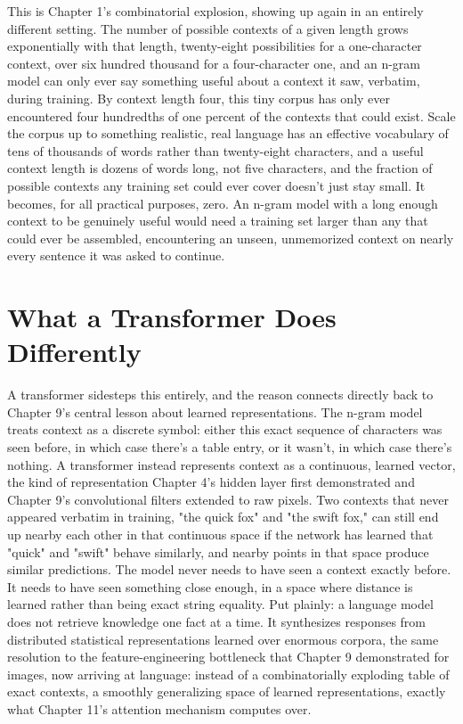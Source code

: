 This is Chapter 1's combinatorial explosion, showing up again in an entirely different setting. The number of possible contexts of a given length grows exponentially with that length, twenty-eight possibilities for a one-character context, over six hundred thousand for a four-character one, and an n-gram model can only ever say something useful about a context it saw, verbatim, during training. By context length four, this tiny corpus has only ever encountered four hundredths of one percent of the contexts that could exist. Scale the corpus up to something realistic, real language has an effective vocabulary of tens of thousands of words rather than twenty-eight characters, and a useful context length is dozens of words long, not five characters, and the fraction of possible contexts any training set could ever cover doesn't just stay small. It becomes, for all practical purposes, zero. An n-gram model with a long enough context to be genuinely useful would need a training set larger than any that could ever be assembled, encountering an unseen, unmemorized context on nearly every sentence it was asked to continue.

\section*{What a Transformer Does Differently}

A transformer sidesteps this entirely, and the reason connects directly back to Chapter 9's central lesson about learned representations. The n-gram model treats context as a discrete symbol: either this exact sequence of characters was seen before, in which case there's a table entry, or it wasn't, in which case there's nothing. A transformer instead represents context as a continuous, learned vector, the kind of representation Chapter 4's hidden layer first demonstrated and Chapter 9's convolutional filters extended to raw pixels. Two contexts that never appeared verbatim in training, "the quick fox" and "the swift fox," can still end up nearby each other in that continuous space if the network has learned that "quick" and "swift" behave similarly, and nearby points in that space produce similar predictions. The model never needs to have seen a context exactly before. It needs to have seen something close enough, in a space where distance is learned rather than being exact string equality. Put plainly: a language model does not retrieve knowledge one fact at a time. It synthesizes responses from distributed statistical representations learned over enormous corpora, the same resolution to the feature-engineering bottleneck that Chapter 9 demonstrated for images, now arriving at language: instead of a combinatorially exploding table of exact contexts, a smoothly generalizing space of learned representations, exactly what Chapter 11's attention mechanism computes over.

